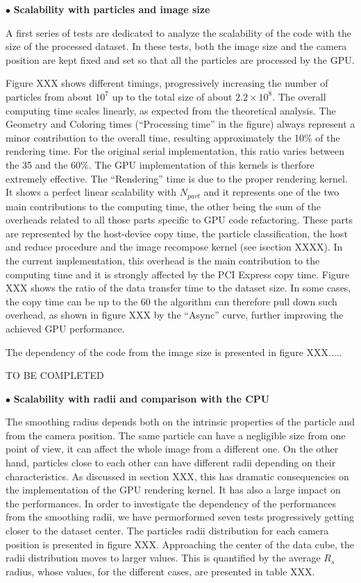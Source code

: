 \documentclass[11pt]{article}
\begin{document}
\noindent$\bullet$ {\bf Scalability with particles and image size}

A first series of tests are dedicated to analyze the scalability of the code
with the size of the processed dataset. In these tests, both the image size
and the camera position are kept fixed and set so that all the particles are processed 
by the GPU.

Figure XXX shows different timings, progressively increasing the number of particles
from about $10^7$ up to the total size of about $2.2\times 10^8$. 
The overall computing time scales linearly, as expected from the theoretical analysis.
The Geometry and Coloring times (``Processing time'' in the figure) always represent 
a minor contribution to the overall time, resulting approximately the 10\% of the rendering 
time. For the original serial implementation, this ratio varies between the 35 and the 60\%.
The GPU implementation of this kernels is therfore extremely effective. The ``Rendering'' time 
is due to the proper rendering kernel. It shows a perfect linear scalability
with $N_{part}$ and it represents one of the two main contributions
to the computing time, the other being the sum of the overheads related to all those 
parts specific to GPU code refactoring. These parts are represented by 
the host-device copy time, the particle classification, the host and reduce procedure 
and the image recompose kernel (see isection XXXX). 
In the current implementation, this overhead is
the main contribution to the computing time and 
it is strongly affected by the PCI Express copy time. Figure XXX shows the ratio 
of the data transfer time to the dataset size. In some cases, the copy time can be 
up to the 60%
the algorithm can therefore pull down such overhead, as shown in figure XXX by
the ``Async'' curve, further improving the achieved GPU performance.  
 
The dependency of the code from the image size is presented in figure XXX..... 

TO BE COMPLETED 

\noindent$\bullet$ {\bf Scalability with radii and comparison with the CPU}

The smoothing radius depends both on the intrinsic properties of the particle
and from the camera position. The same particle can have a negligible size
from one point of view, it can affect the whole image from a different one. 
On the other hand, particles close to each other can have different radii depending
on their characteristics. As discussed in section XXX, this has dramatic consequencies 
on the implementation of the GPU rendering kernel. It has also a large impact
on the performances. In order to investigate the dependency of the performances from
the smoothing radii, we have permorformed seven tests progressively 
getting closer to the dataset center. The particles radii distribution for each
camera position is presented in figure XXX. Approaching the center of the 
data cube, the radii distribution moves to larger values. This is quantified 
by the average $R_s$ radius, whose values, for the different cases, are presented in 
table XXX.
 
\end{document}
